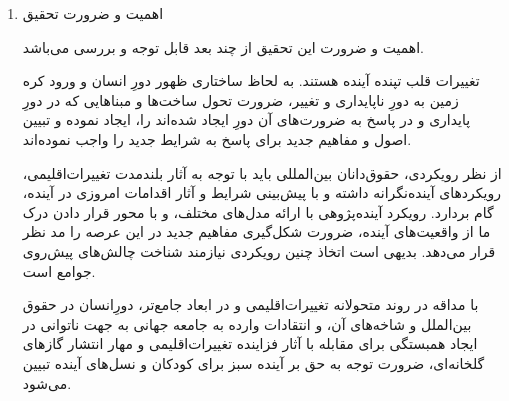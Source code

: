 \begin{enumerate}
اثبات تعهد بین‌المللی دولت در حفظ و حمایت از محیط‌زیست، از دو دریچه قابل توجه است. یکی حق بر محیط‌زیست سالم به عنوان یکی از مصادیق حقوق بشر، که در این صورت مسئولیت بین‌المللی دولت در نقض حقوق انسانی اتباع خود مطرح می‌گردد؛ دیگری از دریچه محیط‌زیست، به عنوان میراث مشترک بشریت.\footnote{افشاری، مریم، «تاثیرات تغییرات آب و هوایی بر صلح و امنیت انسانی»، پایان‌نامه دکتری دانشگاه شهید بهشتی، 1389، ص. 230.}

به لحاظ روشی نگارنده این اثر را زیر مجموعه حقوق محیط‌زیست دانسته و تبیین و نقض حق بر آینده سبز را نیز در قالب حفاظت از حقوق محیط‌زیست به عنوان امانت مشترک بشریت مورد توجه قرار داده است. البته تردیدی نیست که حقوق محیط‌زیست مبتنی بر علایق و منافع مشترک بشریت در حقوق شناخته شده برای افراد و نظریه حقوق بشر است، لذا تضادی میان این دو در طرح و بررسی مسئله وجود ندارد. چرا که رعایت جهانی حقوق و آزادی‌های بنیادین افراد، جزئی از علایق و منافع مشترک بشریت است.\footnote{امیر‌ارجمند، اردشیر، «حفاظت از محیط‌زیست و همبستگی بین‌المللی»، مجله تحقیقات حقوقی، شماره 15، دانشکده حقوق دانشگاه شهید بهشتی، 1373-1374، ص. 344.}


	\item اهمیت و ضرورت تحقیق
	
	
	
	اهمیت و ضرورت این تحقیق از چند بعد قابل توجه و بررسی می‌باشد.
	
	تغییرات قلب تپنده آینده هستند. به لحاظ ساختاری ظهور دورِ انسان و ورود کره زمین به دورِ ناپایداری و تغییر، ضرورت تحول ساخت‌ها و مبنا‌هایی که در دورِ پایداری و در پاسخ به ضرورت‌های آن دورِ ایجاد شده‌اند را، ایجاد نموده و تبیین اصول و مفاهیم جدید برای پاسخ به شرایط جدید را واجب نموده‌اند. 
	
	از نظر رویکردی، حقوق‌دانان بین‌المللی باید با توجه به آثار بلند‌مدت تغییرات‌اقلیمی، رویکرد‌های آینده‌نگرانه داشته و با پیش‌بینی‌ شرایط و آثار اقدامات امروزی در آینده، گام بردارد.
	 رویکرد آینده‌پژوهی با ارائه مدل‌های مختلف، و با محور قرار دادن درک ما از واقعیت‌های آینده، ضرورت شکل‌گیری مفاهیم جدید در این عرصه را مد نظر قرار می‌دهد.
	 بدیهی است اتخاذ چنین رویکردی نیازمند شناخت چالش‌های پیش‌روی جوامع است. 
	
	با مداقه در روند متحولانه تغییرات‌اقلیمی و در ابعاد جامع‌تر، دورِانسان در حقوق بین‌الملل و شاخه‌های آن، و انتقادات وارده به جامعه جهانی به جهت ناتوانی در ایجاد همبستگی برای مقابله با آثار فزاینده تغییرات‌اقلیمی و مهار انتشار گاز‌های گلخانه‌ای، ضرورت توجه به حق بر آینده سبز برای کودکان و نسل‌های آینده تبیین می‌شود. 
	
	
	
	
	

\end{enumerate}
